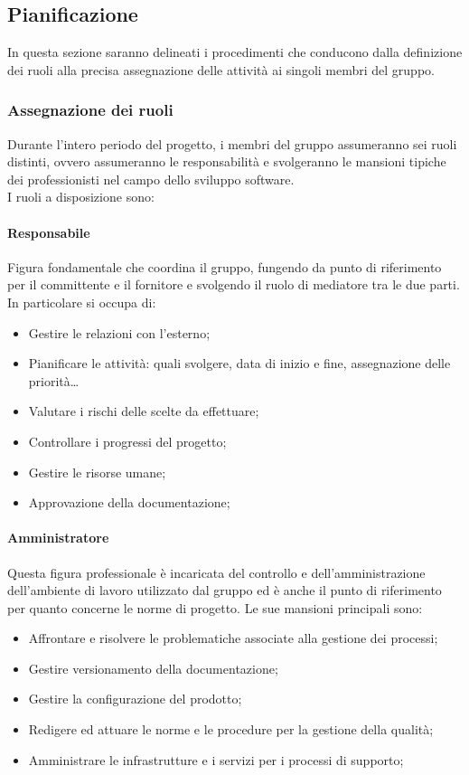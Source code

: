 \documentclass{article}
\begin{document}
\subsection{Pianificazione}
In questa sezione saranno delineati i procedimenti che conducono dalla definizione dei ruoli alla precisa assegnazione delle attività ai singoli membri del gruppo.
\subsubsection{Assegnazione dei ruoli}

Durante l'intero periodo del progetto, i membri del gruppo assumeranno sei ruoli distinti, ovvero assumeranno le responsabilità e svolgeranno le mansioni tipiche dei professionisti nel campo dello sviluppo software.
\\I ruoli a disposizione sono:
\paragraph{Responsabile}\label{responsabile} Figura fondamentale che coordina il gruppo, fungendo da punto di riferimento per il committente e il fornitore e svolgendo il ruolo di mediatore tra le due parti.\\
In particolare si occupa di:
\begin{itemize}
    \item Gestire le relazioni con l'esterno;
    \item Pianificare le attività: quali svolgere, data di inizio e fine, assegnazione delle priorità\dots
    \item Valutare i rischi delle scelte da effettuare;
    \item Controllare i progressi del progetto;
    \item Gestire le risorse umane;
    \item Approvazione della documentazione;
\end{itemize}
\paragraph{Amministratore}\label{amministratore}Questa figura professionale è incaricata del controllo e dell'amministrazione dell'ambiente di lavoro utilizzato dal gruppo ed è anche il punto di riferimento per quanto concerne le norme di progetto. Le sue mansioni principali sono:
\begin{itemize}
    \item Affrontare e risolvere le problematiche associate alla gestione dei processi;
    \item Gestire versionamento della documentazione;
    \item Gestire la configurazione del prodotto;
    \item Redigere ed attuare le norme e le procedure per la gestione della qualità;
    \item Amministrare le infrastrutture e i servizi per i processi di supporto;
\end{itemize}
\end{document}
